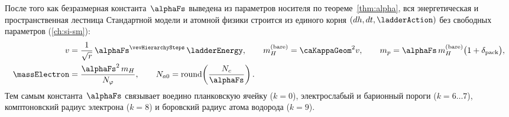 После того как безразмерная константа~$\alphaFs$ выведена из параметров носителя по теореме~\ref{thm:alpha},
вся энергетическая и пространственная лестница Стандартной модели и атомной физики строится из единого корня $(dh, dt, \ladderAction)$ без свободных параметров (\cref{ch:si-sm}):
\begin{align*}
  v &= \frac{1}{\sqrt{r}}\,\alphaFs^{\vevHierarchySteps}\,\ladderEnergy,\qquad
  m_H^{(\mathrm{bare})} = \caKappaGeom^2 v,\qquad
  m_p = \alphaFs\,m_H^{(\mathrm{bare})}\bigl(1 + \delta_{\mathrm{pack}}\bigr),\\
  \massElectron &= \frac{\alphaFs^2\,m_H}{N_\varphi},\qquad
  N_{a0} = \mathrm{round}\!\left(\frac{N_c}{\alphaFs}\right).
\end{align*}
Тем самым константа~$\alphaFs$ связывает воедино планковскую ячейку ($k=0$), электрослабый и барионный пороги ($k=6\ldots 7$), комптоновский радиус электрона ($k=8$) и боровский радиус атома водорода ($k=9$).
